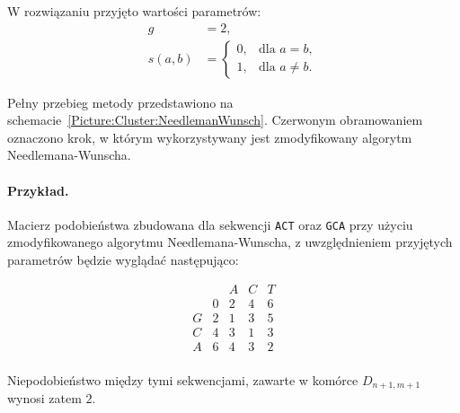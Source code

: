             W rozwiązaniu przyjęto wartości parametrów:
            \begin{align*}
                g &= 2, \\
                s(a, b) &= \begin{cases}
                    0, & \text{dla } a = b, \\
                    1, & \text{dla } a \neq b.
                \end{cases}
            \end{align*}

            Pełny przebieg metody przedstawiono na schemacie~\ref{Picture:Cluster:NeedlemanWunsch}. Czerwonym obramowaniem oznaczono krok, w którym wykorzystywany jest zmodyfikowany algorytm Needlemana-Wunscha.

            \paragraph{Przykład.} Macierz podobieństwa zbudowana dla sekwencji \texttt{ACT} oraz \texttt{GCA} przy użyciu zmodyfikowanego algorytmu Needlemana-Wunscha, z uwzględnieniem przyjętych parametrów będzie wyglądać następująco:

            \[
                \begin{matrix}
                            &        & A      & C      & T      \\
                            &      0 &      2 &      4 &      6 \\
                     G      &      2 &      1 &      3 &      5 \\
                     C      &      4 &      3 &      1 &      3 \\
                     A      &      6 &      4 &      3 &      2 \\
                \end{matrix}
            \]

            Niepodobieństwo między tymi sekwencjami, zawarte w komórce $D_{n + 1, m + 1}$ wynosi zatem $2$.

